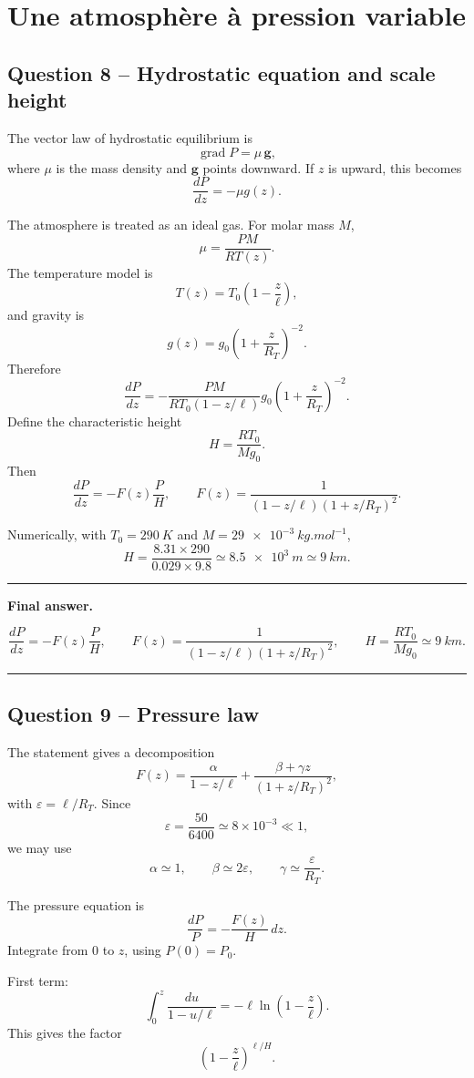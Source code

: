\documentclass[11pt,a4paper]{article}
\newenvironment{finalanswer}{%
  \begin{center}\begin{minipage}{0.94\linewidth}\hrule\vspace{0.45em}\textbf{Final answer. }%
}{%
  \vspace{0.45em}\hrule\end{minipage}\end{center}%
}
\newcommand{\grad}{\operatorname{grad}}
\newcommand{\RT}{R_T}
\begin{document}
\section{Une atmosph\`ere \`a pression variable}

\subsection*{Question 8 -- Hydrostatic equation and scale height}

The vector law of hydrostatic equilibrium is
\[
 \grad P=\mu\,\mathbf{g},
\]
where $\mu$ is the mass density and $\mathbf{g}$ points downward. If $z$ is upward, this becomes
\[
 \frac{dP}{dz}=-\mu g(z).
\]

The atmosphere is treated as an ideal gas. For molar mass $M$,
\[
 \mu=\frac{PM}{RT(z)}.
\]
The temperature model is
\[
 T(z)=T_0\left(1-\frac{z}{\ell}\right),
\]
and gravity is
\[
 g(z)=g_0\left(1+\frac{z}{\RT}\right)^{-2}.
\]
Therefore
\[
 \frac{dP}{dz}
 =-\frac{PM}{RT_0(1-z/\ell)}g_0\left(1+\frac{z}{\RT}\right)^{-2}.
\]
Define the characteristic height
\[
 H=\frac{RT_0}{Mg_0}.
\]
Then
\[
 \frac{dP}{dz}=-F(z)\frac{P}{H},
 \qquad
 F(z)=\frac{1}{(1-z/\ell)(1+z/\RT)^2}.
\]

Numerically, with $T_0=\SI{290}{K}$ and $M=\SI{29e-3}{kg.mol^{-1}}$,
\[
 H=\frac{8.31\times 290}{0.029\times9.8}\simeq\SI{8.5e3}{m}\simeq\SI{9}{km}.
\]

\begin{finalanswer}
\[
\frac{dP}{dz}=-F(z)\frac{P}{H},\qquad
F(z)=\frac{1}{(1-z/\ell)(1+z/\RT)^2},\qquad
H=\frac{RT_0}{Mg_0}\simeq\SI{9}{km}.
\]
\end{finalanswer}

\subsection*{Question 9 -- Pressure law}

The statement gives a decomposition
\[
F(z)=\frac{\alpha}{1-z/\ell}+\frac{\beta+\gamma z}{(1+z/\RT)^2},
\]
with $\varepsilon=\ell/\RT$. Since
\[
 \varepsilon=\frac{50}{6400}\simeq 8\times10^{-3}\ll1,
\]
we may use
\[
\alpha\simeq1,
\qquad
\beta\simeq2\varepsilon,
\qquad
\gamma\simeq\frac{\varepsilon}{\RT}.
\]

The pressure equation is
\[
 \frac{dP}{P}=-\frac{F(z)}{H}\,dz.
\]
Integrate from $0$ to $z$, using $P(0)=P_0$.

First term:
\[
 \int_0^z \frac{du}{1-u/\ell}
 =-\ell\ln\left(1-\frac{z}{\ell}\right).
\]
This gives the factor
\[
 \left(1-\frac{z}{\ell}\right)^{\ell/H}.
\]
\end{document}
